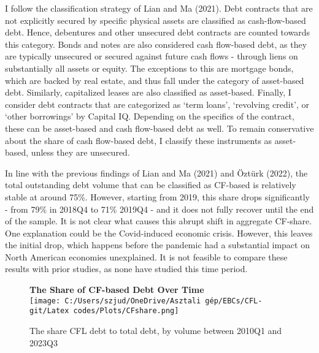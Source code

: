 \documentclass[12pt]{article}
\begin{document}
I follow the classification strategy of Lian and Ma (2021). Debt contracts that are not explicitly secured by specific physical assets are classified as cash-flow-based debt. Hence, debentures and other unsecured debt contracts are counted towards this category. Bonds and notes are also considered cash flow-based debt, as they are typically unsecured or secured against future cash flows - through liens on substantially all assets or equity. The exceptions to this are mortgage bonds, which are backed by real estate, and thus fall under the category of asset-based debt. Similarly, capitalized leases are also classified as asset-based. Finally, I consider debt contracts that are categorized as `term loans', `revolving credit', or `other borrowings' by Capital IQ. Depending on the specifics of the contract, these can be asset-based and cash flow-based debt as well. To remain conservative about the share of cash flow-based debt, I classify these instruments as asset-based, unless they are unsecured. 
 
In line with the previous findings of Lian and Ma (2021) and Öztürk (2022), the total outstanding debt volume that can be classified as CF-based is relatively stable at around 75\%. However, starting from 2019, this share drops significantly - from 79\% in 2018Q4 to 71\% 2019Q4 - and it does not fully recover until the end of the sample. It is not clear what causes this abrupt shift in aggregate CF-share. One explanation could be the Covid-induced economic crisis. However, this leaves the initial drop, which happens before the pandemic had a substantial impact on North American economies unexplained. It is not feasible to compare these results with prior studies, as none have studied this time period.


\begin{figure}[H]  %
    \centering
    \textbf{\large The Share of CF-based Debt Over Time \vspace{2mm}} \\  %
    \label{chart:CFLshare}
    \texttt{[image: C:/Users/szjud/OneDrive/Asztali gép/EBCs/CFL-git/Latex codes/Plots/CFshare.png]} \\
     \caption{\small The share CFL debt to total debt, by volume between 2010Q1 and 2023Q3}
\end{figure}
\end{document}
